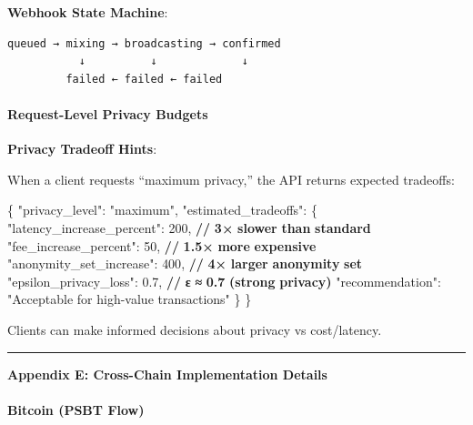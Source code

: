 \documentclass[
  11pt,
]{article}
\newenvironment{Shaded}{\begin{snugshade}}{\end{snugshade}}
\newcommand{\DataTypeTok}[1]{\textcolor[rgb]{0.13,0.29,0.53}{#1}}
\newcommand{\DecValTok}[1]{\textcolor[rgb]{0.00,0.00,0.81}{#1}}
\newcommand{\ErrorTok}[1]{\textcolor[rgb]{0.64,0.00,0.00}{\textbf{#1}}}
\newcommand{\FloatTok}[1]{\textcolor[rgb]{0.00,0.00,0.81}{#1}}
\newcommand{\FunctionTok}[1]{\textcolor[rgb]{0.00,0.00,0.00}{#1}}
\newcommand{\StringTok}[1]{\textcolor[rgb]{0.31,0.60,0.02}{#1}}
\begin{document}
\textbf{Webhook State Machine}:

\begin{verbatim}
queued → mixing → broadcasting → confirmed
           ↓          ↓             ↓
         failed ← failed ← failed
\end{verbatim}

\hypertarget{request-level-privacy-budgets}{%
\paragraph{Request-Level Privacy
Budgets}\label{request-level-privacy-budgets}}

\textbf{Privacy Tradeoff Hints}:

When a client requests ``maximum privacy,'' the API returns expected
tradeoffs:

\begin{Shaded}
\begin{Highlighting}[]
\FunctionTok{\{}
  \DataTypeTok{"privacy\_level"}\FunctionTok{:} \StringTok{"maximum"}\FunctionTok{,}
  \DataTypeTok{"estimated\_tradeoffs"}\FunctionTok{:} \FunctionTok{\{}
    \DataTypeTok{"latency\_increase\_percent"}\FunctionTok{:} \DecValTok{200}\FunctionTok{,}  \ErrorTok{//} \ErrorTok{3×} \ErrorTok{slower} \ErrorTok{than} \ErrorTok{standard}
    \DataTypeTok{"fee\_increase\_percent"}\FunctionTok{:} \DecValTok{50}\FunctionTok{,}       \ErrorTok{//} \ErrorTok{1.5×} \ErrorTok{more} \ErrorTok{expensive}
    \DataTypeTok{"anonymity\_set\_increase"}\FunctionTok{:} \DecValTok{400}\FunctionTok{,}    \ErrorTok{//} \ErrorTok{4×} \ErrorTok{larger} \ErrorTok{anonymity} \ErrorTok{set}
    \DataTypeTok{"epsilon\_privacy\_loss"}\FunctionTok{:} \FloatTok{0.7}\FunctionTok{,}      \ErrorTok{//} \ErrorTok{ε} \ErrorTok{≈} \ErrorTok{0.7} \ErrorTok{(strong} \ErrorTok{privacy)}
    \DataTypeTok{"recommendation"}\FunctionTok{:} \StringTok{"Acceptable for high{-}value transactions"}
  \FunctionTok{\}}
\FunctionTok{\}}
\end{Highlighting}
\end{Shaded}

Clients can make informed decisions about privacy vs cost/latency.

\begin{center}\rule{0.5\linewidth}{0.5pt}\end{center}

\textbf{Appendix E: Cross-Chain Implementation Details}

\hypertarget{bitcoin-psbt-flow}{%
\paragraph{Bitcoin (PSBT Flow)}\label{bitcoin-psbt-flow}}
\end{document}
